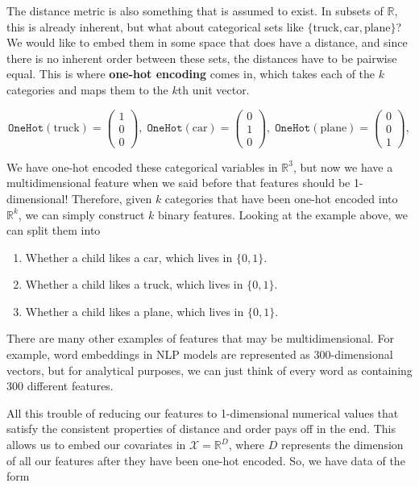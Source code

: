 \documentclass{article}
\theoremstyle{definition}
\begin{document}
  The distance metric is also something that is assumed to exist. In subsets of $\mathbb{R}$, this is already inherent, but what about categorical sets like $\{\text{truck}, \text{car}, \text{plane}\}$? We would like to embed them in some space that does have a distance, and since there is no inherent order between these sets, the distances have to be pairwise equal. This is where \textbf{one-hot encoding} comes in, which takes each of the $k$ categories and maps them to the $k$th unit vector. 

    \[\texttt{OneHot}(\text{truck}) = \begin{pmatrix} 1 \\ 0 \\ 0 \end{pmatrix}, \; \texttt{OneHot}(\text{car}) = \begin{pmatrix} 0 \\ 1 \\ 0 \end{pmatrix}, \; \texttt{OneHot}(\text{plane}) = \begin{pmatrix} 0 \\ 0 \\ 1 \end{pmatrix}, \]

  We have one-hot encoded these categorical variables in $\mathbb{R}^3$, but now we have a multidimensional feature when we said before that features should be 1-dimensional! Therefore, given $k$ categories that have been one-hot encoded into $\mathbb{R}^k$, we can simply construct $k$ binary features. Looking at the example above, we can split them into 

  \begin{enumerate}
    \item Whether a child likes a car, which lives in $\{0, 1\}$. 
    \item Whether a child likes a truck, which lives in $\{0, 1\}$. 
    \item Whether a child likes a plane, which lives in $\{0, 1\}$. 
  \end{enumerate}

  There are many other examples of features that may be multidimensional. For example, word embeddings in NLP models are represented as 300-dimensional vectors, but for analytical purposes, we can just think of every word as containing 300 different features. 

  All this trouble of reducing our features to 1-dimensional numerical values that satisfy the consistent properties of distance and order pays off in the end. This allows us to embed our covariates in $\mathcal{X} = \mathbb{R}^D$, where $D$ represents the dimension of all our features after they have been one-hot encoded. So, we have data of the form
\end{document}
